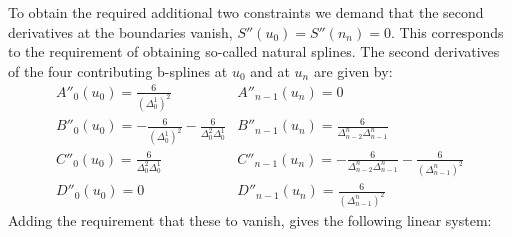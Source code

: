 \documentclass[a4paper,10pt,twosided]{article}
\begin{document}
To obtain the required additional two constraints we demand that the second derivatives 
at the boundaries vanish, $S''(u_0)=S''(n_n)=0$. This corresponds to the requirement of
obtaining so-called natural splines.
The second derivatives of the four contributing b-splines at $u_0$ and at $u_n$ are given by:
\begin{equation}
\begin{array}{ll}
     A''_0(u_0) =  \frac{6}{(\Delta^1_0)^2}                                    &    A''_{n-1}(u_n) = 0                                                                                      
\\   B''_0(u_0) = -\frac{6}{(\Delta^1_0)^2} - \frac{6}{\Delta^2_0\Delta^1_0}   &    B''_{n-1}(u_n) =   \frac{6}{\Delta^n_{n-2}\Delta^{n}_{n-1}} 
\\   C''_0(u_0) =  \frac{6}{\Delta^2_0\Delta^1_0}                              &    C''_{n-1}(u_n) = - \frac{6}{\Delta^{n}_{n-2}\Delta^{n}_{n-1}} - \frac{6}{(\Delta^{n}_{n-1})^2} 
\\   D''_0(u_0) =  0                                                           &    D''_{n-1}(u_n) =   \frac{6}{(\Delta^{n}_{n-1})^2}
\end{array}
\end{equation}
Adding the requirement that these to vanish, gives the following linear system:
\end{document}
